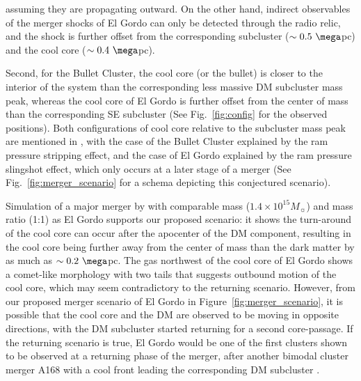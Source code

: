 assuming they are propagating outward. On the other hand, indirect
observables of the merger shocks of El Gordo can only be detected through the radio relic, and the shock is
further offset from the corresponding subcluster ($\sim 0.5~\mega$pc) and
the cool core ($\sim 0.4~\mega$pc). \par
Second, for the Bullet Cluster, the cool core (or the bullet) is closer to the
interior of the system than the corresponding less massive DM subcluster mass
peak, whereas the cool core of El Gordo is further offset from the center of
mass than the corresponding SE subcluster (See Fig.~\ref{fig:config} for
the observed positions). 
Both configurations of cool core relative to the subcluster mass peak are
mentioned in \cite{Markevitch2007}, with the case of the Bullet Cluster
explained by the ram pressure stripping effect, and the case of El Gordo
explained by the ram pressure slingshot effect, which only occurs at a
later stage of a merger (See Fig.~\ref{fig:merger_scenario} for a schema depicting this conjectured scenario).\par 
Simulation of a major merger by
\cite{Mathis05} with comparable mass ($1.4 \times 10^{15} M_{\sun}$) and
mass ratio (1:1) as El Gordo supports
our proposed scenario: it shows the turn-around of the cool core can occur after the
apocenter of the DM component, resulting in the cool core being further
away from the center of mass than the dark matter by as much as $\sim
0.2~\mega$pc.  The gas northwest of the cool core of El Gordo shows a comet-like
morphology with two tails that suggests outbound motion of the cool core, which may seem
contradictory to the returning scenario. However, from our proposed merger
scenario of El Gordo in Figure~\ref{fig:merger_scenario},
it is possible that the cool core and the DM are observed to be moving in
opposite directions, with the DM subcluster started returning for a second core-passage. If the returning scenario is true, El Gordo would be one of the first
clusters shown to be observed at a returning phase of the merger, after another
bimodal cluster merger A168 with a cool front leading the corresponding DM
subcluster \citep{Hallman04}.


